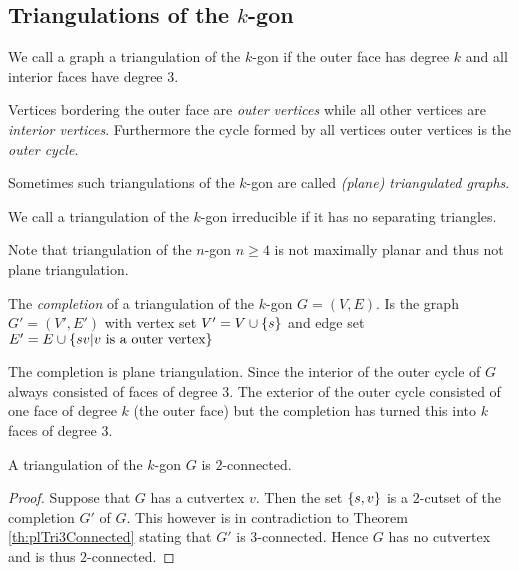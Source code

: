 \subsection{Triangulations of the $k$-gon}

\begin{defi}
We call a graph a triangulation of the $k$-gon if the outer face has degree $k$ and all interior faces have degree $3$.
\end{defi}
Vertices bordering the outer face are \emph{outer vertices} while all other vertices are \emph{interior vertices}. Furthermore the cycle formed by all vertices outer vertices is the \emph{outer cycle}.

Sometimes such triangulations of the $k$-gon are called \emph{(plane) triangulated graphs}.


\begin{defi}
We call a triangulation of the $k$-gon irreducible if it has no separating triangles.
\end{defi}


Note that triangulation of the $n$-gon $n\geq 4$ is not maximally planar and thus not plane triangulation.

The \emph{completion} of a triangulation of the $k$-gon $G = (V, E)$. Is the graph $G'= (V', E')$ with vertex set $V' = V \cup \left\lbrace {s} \right\rbrace$ and edge set $E' = E \cup \left\lbrace { sv | v \text{ is a outer vertex}} \right\rbrace$

The completion is plane triangulation.  %
Since the interior of the outer cycle of $G$ always consisted of faces of degree 3. The exterior of the outer cycle consisted of one face of degree $k$ (the outer face) but the completion has turned this into $k$ faces of degree $3$.

\begin{thrm}
A triangulation of the $k$-gon $G$ is $2$-connected.
\end{thrm}
\begin{proof}
Suppose that $G$ has a cutvertex $v$. Then the set $\left\lbrace {s, v} \right\rbrace$ is a $2$-cutset of the completion $G'$ of $G$. This however is in contradiction to Theorem \ref{th:plTri3Connected} stating that $G'$ is $3$-connected. Hence $G$ has no cutvertex and is thus $2$-connected.
\end{proof}



